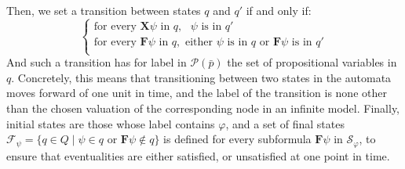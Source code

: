 \documentclass[11pt]{article}
\newcommand{\X}{{\mathbf{X}}}
\newcommand{\F}{{\mathbf{F}}}
\newcommand{\phii}{{\varphi}}
\theoremstyle{definition}
\begin{document}
Then, we set a transition between states $q$ and $q'$ if and only if:
\begin{equation*}
    \begin{cases}
        \mbox{for every }\X\psi\mbox{ in }q,\mbox{ }\psi\mbox{ is in }q'\\
        \mbox{for every }\F\psi\mbox{ in }q,\mbox{ either }\psi\mbox{ is in }q\mbox{ or }\F\psi\mbox{ is in }q'\\
    \end{cases}
\end{equation*}
And such a transition has for label in $\mathcal{P}(\bar{p})$ the set of propositional variables in $q$.
Concretely, this means that transitioning between two states in the automata moves forward of one unit in time, and the label of the transition
is none other than the chosen valuation of the corresponding node in an infinite model. Finally, initial states are those whose label contains $\phii$,
and a set of final states $\mathcal{F}_\psi = \{q\in Q\mid\psi\in q \mbox{ or }\F\psi\not\in q\}$ is defined for every subformula $\F\psi$ in $\mathcal{S}_\phii$, to ensure 
that eventualities are either satisfied, or unsatisfied at one point in time.
\end{document}
